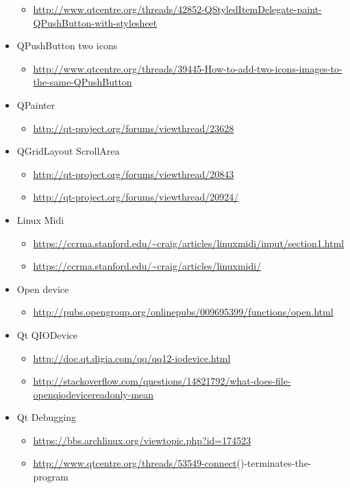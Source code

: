 \documentclass[9pt,b5paper]{article}
\begin{document}
\begin{itemize}
\begin{itemize}
\item \url{http://www.qtcentre.org/threads/42852-QStyledItemDelegate-paint-QPushButton-with-stylesheet}
\end{itemize}
\item QPushButton two icons
\begin{itemize}
\item \url{http://www.qtcentre.org/threads/39445-How-to-add-two-icons-images-to-the-same-QPushButton}
\end{itemize}
\item QPainter
\begin{itemize}
\item \url{http://qt-project.org/forums/viewthread/23628}
\end{itemize}
\item QGridLayout ScrollArea
\begin{itemize}
\item \url{http://qt-project.org/forums/viewthread/20843}
\item \url{http://qt-project.org/forums/viewthread/20924/}
\end{itemize}
\item Linux Midi
\begin{itemize}
\item \url{https://ccrma.stanford.edu/~craig/articles/linuxmidi/input/section1.html}
\item \url{https://ccrma.stanford.edu/~craig/articles/linuxmidi/}
\end{itemize}
\item Open device
\begin{itemize}
\item \url{http://pubs.opengroup.org/onlinepubs/009695399/functions/open.html}
\end{itemize}
\item Qt QIODevice
\begin{itemize}
\item \url{http://doc.qt.digia.com/qq/qq12-iodevice.html}
\item \url{http://stackoverflow.com/questions/14821792/what-does-file-openqiodevicereadonly-mean}
\end{itemize}
\item Qt Debugging
\begin{itemize}
\item \url{https://bbs.archlinux.org/viewtopic.php?id=174523}
\item \url{http://www.qtcentre.org/threads/53549-connect}()-terminates-the-program
\end{itemize}

\end{itemize}
\end{document}
